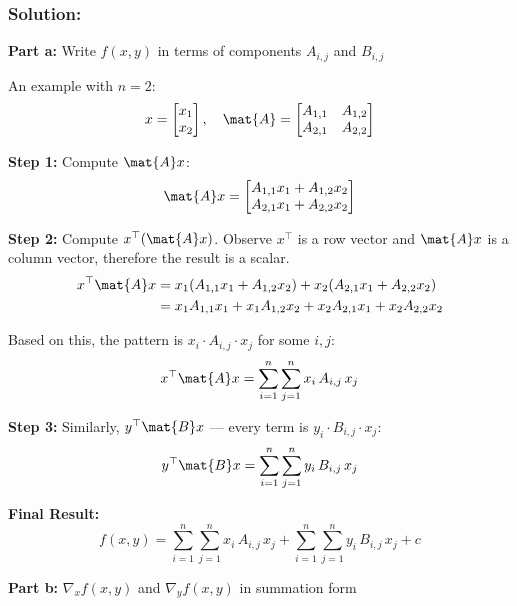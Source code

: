 \documentclass{article}
\begin{document}
\begin{aprob}
    \subsubsection*{Solution:}

    \begin{mdframed}
    \textbf{\large Part a:} Write $f(x,y)$ in terms of components $A_{i,j}$ and $B_{i,j}$
    \end{mdframed}

    An example with $n = 2$:
    \[
        x = \begin{bmatrix} x_1 \\ x_2 \end{bmatrix}, \quad \mat{A} = \begin{bmatrix} A_{1,1} & A_{1,2} \\ A_{2,1} & A_{2,2} \end{bmatrix}
    \]

    \textbf{Step 1:} Compute $\mat{A}x$:
    \[
        \mat{A}x = \begin{bmatrix} A_{1,1} x_1 + A_{1,2} x_2 \\ A_{2,1} x_1 + A_{2,2} x_2 \end{bmatrix}
    \]

    \textbf{Step 2:} Compute $x^\top(\mat{A}x)$. Observe $x^\top$ is a row vector and $\mat{A}x$ is a column vector, therefore the result is a scalar.
    \begin{align*}
        x^\top \mat{A} x &= x_1(A_{1,1} x_1 + A_{1,2} x_2) + x_2(A_{2,1} x_1 + A_{2,2} x_2) \\
        &= x_1 A_{1,1} x_1 + x_1 A_{1,2} x_2 + x_2 A_{2,1} x_1 + x_2 A_{2,2} x_2
    \end{align*}

    Based on this, the pattern is $x_i \cdot A_{i,j} \cdot x_j$ for some $i, j$:
    \[
        x^\top \mat{A} x = \sum_{i=1}^{n} \sum_{j=1}^{n} x_i \, A_{i,j} \, x_j
    \]

    \textbf{Step 3:} Similarly, $y^\top \mat{B} x$ --- every term is $y_i \cdot B_{i,j} \cdot x_j$:
    \[
        y^\top \mat{B} x = \sum_{i=1}^{n} \sum_{j=1}^{n} y_i \, B_{i,j} \, x_j
    \]

    \textbf{Final Result:}
    \[
        \boxed{f(x,y) = \sum_{i=1}^{n} \sum_{j=1}^{n} x_i \, A_{i,j} \, x_j + \sum_{i=1}^{n} \sum_{j=1}^{n} y_i \, B_{i,j} \, x_j + c}
    \]

    \bigskip
    \begin{mdframed}
    \textbf{\large Part b:} $\nabla_x f(x,y)$ and $\nabla_y f(x,y)$ in summation form
    \end{mdframed}


\end{aprob}
\end{document}
